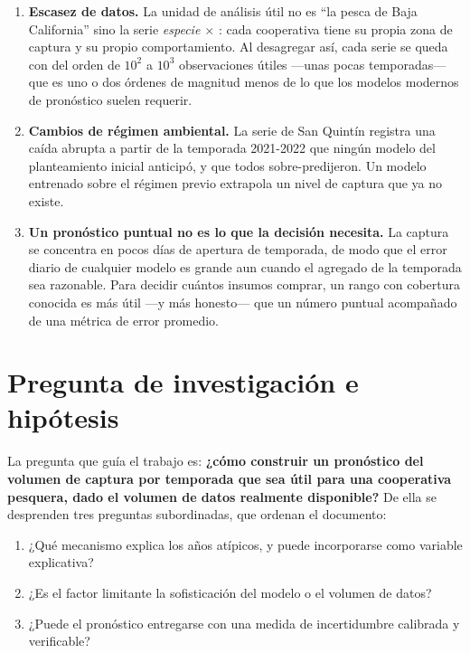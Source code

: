 \begin{enumerate}
  \item \textbf{Escasez de datos.} La unidad de análisis útil no es ``la pesca de Baja
  California'' sino la serie \emph{especie $\times$ \ue{}}: cada cooperativa tiene su propia
  zona de captura y su propio comportamiento. Al desagregar así, cada serie se queda con del
  orden de $10^{2}$ a $10^{3}$ observaciones útiles ---unas pocas temporadas--- que es uno o
  dos órdenes de magnitud menos de lo que los modelos modernos de pronóstico suelen requerir.

  \item \textbf{Cambios de régimen ambiental.} La serie de San Quintín registra una caída
  abrupta a partir de la temporada 2021-2022 que ningún modelo del planteamiento inicial
  anticipó, y que todos sobre-predijeron. Un modelo entrenado sobre el régimen previo
  extrapola un nivel de captura que ya no existe.

  \item \textbf{Un pronóstico puntual no es lo que la decisión necesita.} La captura se
  concentra en pocos días de apertura de temporada, de modo que el error diario de cualquier
  modelo es grande aun cuando el agregado de la temporada sea razonable. Para decidir cuántos
  insumos comprar, un rango con cobertura conocida es más útil ---y más honesto--- que un
  número puntual acompañado de una métrica de error promedio.
\end{enumerate}

\section{Pregunta de investigación e hipótesis}

La pregunta que guía el trabajo es: \textbf{¿cómo construir un pronóstico del volumen de
captura por temporada que sea útil para una cooperativa pesquera, dado el volumen de datos
realmente disponible?} De ella se desprenden tres preguntas subordinadas, que ordenan el
documento:

\begin{enumerate}
  \item ¿Qué mecanismo explica los años atípicos, y puede incorporarse como variable
  explicativa?
  \item ¿Es el factor limitante la sofisticación del modelo o el volumen de datos?
  \item ¿Puede el pronóstico entregarse con una medida de incertidumbre calibrada y verificable?
\end{enumerate}

